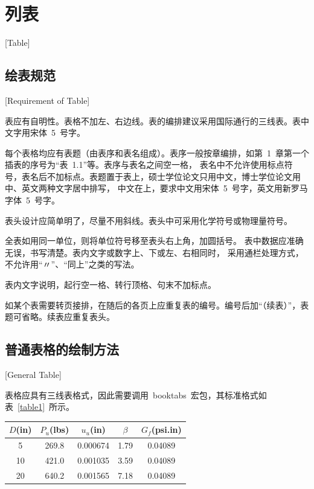 
%
%
%

\chapter{列表}[Table]
\label{chap04}

\section{绘表规范}[Requirement of Table]

表应有自明性。表格不加左、右边线。表的编排建议采用国际通行的三线表。表中文字用宋体~5~号字。

每个表格均应有表题（由表序和表名组成）。表序一般按章编排，如第~1~章第一个插表的序号为“表~1.1”等。表序与表名之间空一格，
表名中不允许使用标点符号，表名后不加标点。表题置于表上，硕士学位论文只用中文，博士学位论文用中、英文两种文字居中排写，
中文在上，要求中文用宋体~5~号字，英文用新罗马字体~5~号字。

表头设计应简单明了，尽量不用斜线。表头中可采用化学符号或物理量符号。

全表如用同一单位，则将单位符号移至表头右上角，加圆括号。
表中数据应准确无误，书写清楚。表内文字或数字上、下或左、右相同时，
采用通栏处理方式，不允许用“〃”、“同上”之类的写法。

表内文字说明，起行空一格、转行顶格、句末不加标点。

如某个表需要转页接排，在随后的各页上应重复表的编号。编号后加“（续表）”，表题可省略。续表应重复表头。

\section{普通表格的绘制方法}[General Table]

表格应具有三线表格式，因此需要调用~booktabs~宏包，其标准格式如表~\ref{table1}~所示。
\begin{table}[htbp]
  \vspace{0.5em}\centering\wuhao
  \begin{tabular}{ccccc}
    \toprule[1.5pt]
    $D$(in) & $P_u$(lbs) & $u_u$(in) & $\beta$ & $G_f$(psi.in) \\
    \midrule[1pt]
    5       & 269.8      & 0.000674  & 1.79    & 0.04089       \\
    10      & 421.0      & 0.001035  & 3.59    & 0.04089       \\
    20      & 640.2      & 0.001565  & 7.18    & 0.04089       \\
    \bottomrule[1.5pt]
  \end{tabular}
\end{table}

